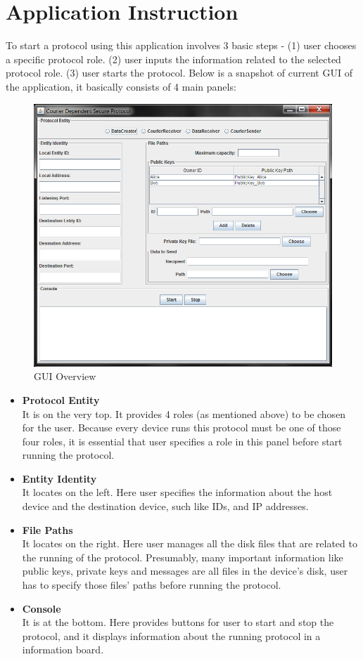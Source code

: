 \chapter{Application Instruction}
To start a protocol using this application involves 3 basic steps - (1) user chooses a specific protocol role. (2) user inputs the information related to the selected protocol role. (3) user starts the protocol. Below is a snapshot of current GUI of the application, it basically consists of 4 main panels:

\begin{figure}[h!]
\centering
\includegraphics[width=\textwidth,natwidth=818,natheight=722]{figures/guiall.png}
\caption{GUI Overview}
\end{figure}

\begin{itemize}
\item \textbf{Protocol Entity}\\
It is on the very top. It provides 4 roles (as mentioned above) to be chosen for the user. Because every device runs this protocol must be one of those four roles, it is essential that user specifies a role in this panel before start running the protocol.
\item \textbf{Entity Identity}\\
It locates on the left. Here user specifies the information about the host device and the destination device, such like IDs, and IP addresses.
\item \textbf{File Paths}\\
It locates on the right. Here user manages all the disk files that are related to the running of the protocol. Presumably, many important information like public keys, private keys and messages are all files in the device's disk, user has to specify those files' paths before running the protocol.
\item \textbf{Console}\\
It is at the bottom. Here provides buttons for user to start and stop the protocol, and it displays information about the running protocol in a information board.
\end{itemize}

